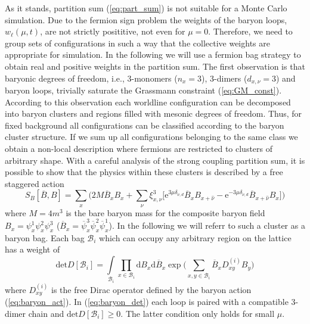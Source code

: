 \documentclass{PoS}
\begin{document}
As it stands, partition sum (\ref{eq:part_sum}) is not suitable for a Monte Carlo simulation. Due to the fermion sign problem the weights of the baryon loops, $w_{\ell}(\mu,t)$, are not strictly posititive, not even for $\mu = 0$. Therefore, we need to group sets of configurations in such a way that the collective weights are appropriate for simulation. In the following we will use a fermion bag strategy \cite{Chandrasekharan:2009wc} to obtain real and positive weights in the partition sum. The first observation is that baryonic degrees of freedom, i.e., 3-monomers ($n_x = 3$), 3-dimers ($d_{x,\nu}=3$) and baryon loops, trivially saturate the Grassmann constraint (\ref{eq:GM_const}). According to this observation each worldline configuration can be decomposed into baryon clusters and regions filled with mesonic degrees of freedom. Thus, for fixed background all configurations can be classified according to the baryon cluster structure. If we sum up all configurations belonging to the same class we obtain a non-local description where fermions are restricted to clusters of arbitrary shape. With a careful analysis of the strong coupling partition sum, it is possible to show that the physics within these clusters is described by a free staggered action 
\begin{equation}
S_B\left[\overline{B},B\right] = \sum_x\Big(2M\overline{B}_x B_x +\sum_{\nu} \xi_{x,\nu}^3\Big[ \text{e}^{3\mu\delta_{\nu,d}}\overline{B}_{x} B_{x+\hat{\nu}} - \text{e}^{-3\mu\delta_{\nu,d}}\overline{B}_{x+\hat{\nu}}B_{x} \Big] \Big)
\label{eq:baryon_act}
\end{equation}
where $M = 4m^3$ is the bare baryon mass for the composite baryon field $B_x = \psi^{1}_x\psi^{2}_x\psi^{3}_x$ ($\overline{B}_x = \overline{\psi}^{3}_x\overline{\psi}^{2}_x\overline{\psi}^{1}_x$). In the following we will referr to such a cluster as a baryon bag. Each bag $\mathcal{B}_i$ which can occupy any arbitrary region on the lattice has a weight of
\begin{equation}
\text{det} D[\mathcal{B}_i]  = \int\limits_{\mathcal{B}_i} \prod_{x\in\mathcal{B}_i} \text{d} B_x \text{d}\overline{B}_x \exp\Big(\sum\limits_{x,y \in \mathcal{B}_i} \overline{B}_x D^{(i)}_{xy} B_y\Big)
\label{eq:baryon_det}
\end{equation}
where $D^{(i)}_{xy}$ is the free Dirac operator defined by the baryon action (\ref{eq:baryon_act}). In (\ref{eq:baryon_det}) each loop is paired with a compatible 3-dimer chain and $\text{det} D[\mathcal{B}_i] \geq 0$. The latter condition only holds for small $\mu$.\\
\end{document}

